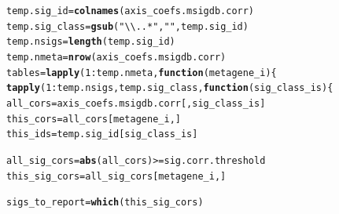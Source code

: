 \documentclass{article}\usepackage[]{graphicx}\usepackage[]{color}
\makeatletter
\newcommand{\hlnum}[1]{\textcolor[rgb]{0.686,0.059,0.569}{#1}}%
\newcommand{\hlstr}[1]{\textcolor[rgb]{0.192,0.494,0.8}{#1}}%
\newcommand{\hlopt}[1]{\textcolor[rgb]{0,0,0}{#1}}%
\newcommand{\hlstd}[1]{\textcolor[rgb]{0.345,0.345,0.345}{#1}}%
\newcommand{\hlkwa}[1]{\textcolor[rgb]{0.161,0.373,0.58}{\textbf{#1}}}%
\newcommand{\hlkwb}[1]{\textcolor[rgb]{0.69,0.353,0.396}{#1}}%
\newcommand{\hlkwc}[1]{\textcolor[rgb]{0.333,0.667,0.333}{#1}}%
\newcommand{\hlkwd}[1]{\textcolor[rgb]{0.737,0.353,0.396}{\textbf{#1}}}%
\newenvironment{kframe}{%
 \def\at@end@of@kframe{}%
 \ifinner\ifhmode%
  \def\at@end@of@kframe{\end{minipage}}%
  \begin{minipage}{\columnwidth}%
 \fi\fi%
 \def\FrameCommand##1{\hskip\@totalleftmargin \hskip-\fboxsep
 \colorbox{shadecolor}{##1}\hskip-\fboxsep
     \hskip-\linewidth \hskip-\@totalleftmargin \hskip\columnwidth}%
 \MakeFramed {\advance\hsize-\width
   \@totalleftmargin\z@ \linewidth\hsize
   \@setminipage}}%
 {\par\unskip\endMakeFramed%
 \at@end@of@kframe}
\newenvironment{knitrout}{}{} %
\makeatother
\begin{document}
\begin{knitrout}
\color{fgcolor}\begin{kframe}
\begin{alltt}
\hlstd{temp.sig_id} \hlkwb{=} \hlkwd{colnames}\hlstd{(axis_coefs.msigdb.corr)}
\hlstd{temp.sig_class} \hlkwb{=} \hlkwd{gsub}\hlstd{(}\hlstr{"\textbackslash{}\textbackslash{}..*"}\hlstd{,} \hlstr{""}\hlstd{, temp.sig_id)}
\hlstd{temp.nsigs} \hlkwb{=} \hlkwd{length}\hlstd{(temp.sig_id)}
\hlstd{temp.nmeta} \hlkwb{=} \hlkwd{nrow}\hlstd{(axis_coefs.msigdb.corr)}
\hlstd{tables} \hlkwb{=} \hlkwd{lapply}\hlstd{(}\hlnum{1}\hlopt{:}\hlstd{temp.nmeta,} \hlkwa{function}\hlstd{(}\hlkwc{metagene_i}\hlstd{) \{}
        \hlkwd{tapply}\hlstd{(}\hlnum{1}\hlopt{:}\hlstd{temp.nsigs, temp.sig_class,} \hlkwa{function}\hlstd{(}\hlkwc{sig_class_is}\hlstd{) \{}
                \hlstd{all_cors} \hlkwb{=} \hlstd{axis_coefs.msigdb.corr[, sig_class_is]}
                \hlstd{this_cors} \hlkwb{=} \hlstd{all_cors[metagene_i, ]}
                \hlstd{this_ids} \hlkwb{=} \hlstd{temp.sig_id[sig_class_is]}

                \hlstd{all_sig_cors} \hlkwb{=} \hlkwd{abs}\hlstd{(all_cors)} \hlopt{>=} \hlstd{sig.corr.threshold}
                \hlstd{this_sig_cors} \hlkwb{=} \hlstd{all_sig_cors[metagene_i, ]}

                \hlstd{sigs_to_report} \hlkwb{=} \hlkwd{which}\hlstd{(this_sig_cors)}


\end{alltt}
\end{kframe}
\end{knitrout}
\end{document}
